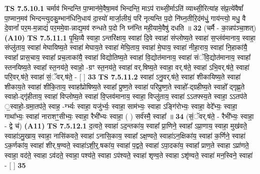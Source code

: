 \documentclass[17pt]{extarticle}
\begin{document}
                                        \textbf{ TS 7.5.10.1} \newline
                  चर्माव॑ भिन्दन्ति पा॒प्मान॑मे॒वैषा॒मव॑ भिन्दन्ति॒ माऽप॑ राथ्सी॒र्माऽति॑ व्याथ्सी॒रित्या॑ह संप्र॒त्ये॑वैषां᳚ पा॒प्मान॒मव॑ भिन्दन्त्युदकु॒म्भान॑धिनि॒धाय॑ दा॒स्यो॑ मार्जा॒लीयं॒ परि॑ नृत्यन्ति प॒दो नि॑घ्न॒तीरि॒दंम॑धुं॒ गाय॑न्त्यो॒ मधु॒ वै दे॒वानां᳚ पर॒म-म॒न्नाद्यं॑ पर॒ममे॒वा-न्नाद्य॒मव॑ रुन्धते प॒दो नि घ्न॑न्ति मही॒यामे॒वैषु॑ दधति ॥ \textbf{  32} \newline
                  \newline
                      (चर्मै - का॒न्नप॑ञ्चा॒शत्)  \textbf{(A10)} \newline \newline
                                        \textbf{ TS 7.5.11.1} \newline
                  पृ॒थि॒व्यै स्वाहा॒ ऽन्तरि॑क्षाय॒ स्वाहा॑ दि॒वे स्वाहा॑ संप्लोष्य॒ते स्वाहा॑ स॒प्लंव॑मानाय॒ स्वाहा॒ संप्लु॑ताय॒ स्वाहा॑ मेघायिष्य॒ते स्वाहा॑ मेघाय॒ते स्वाहा॑ मेघि॒ताय॒ स्वाहा॑ मे॒घाय॒ स्वाहा॑ नीहा॒राय॒ स्वाहा॑ नि॒हाका॑यै॒ स्वाहा᳚ प्रास॒चाय॒ स्वाहा᳚ प्रच॒लाका॑यै॒ स्वाहा॑ विद्योतिष्य॒ते स्वाहा॑ वि॒द्योत॑मानाय॒ स्वाहा॑ संॅवि॒द्योत॑मानाय॒ स्वाहा᳚ स्तनयिष्य॒ते स्वाहा᳚ स्त॒नय॑ते॒ स्वाहो॒ -ग्रꣳ स्त॒नय॑ते॒ स्वाहा॑ वर्.षिष्य॒ते स्वाहा॒ वर्.ष॑ते॒ स्वाहा॑ ऽभि॒वर्.ष॑ते॒ स्वाहा॑ परि॒वर्.ष॑ते॒ स्वाहा॑ सं॒ॅवर्.ष॑ते॒ - [  ] \textbf{  33} \newline
                  \newline
                                \textbf{ TS 7.5.11.2} \newline
                  स्वाहा॑ ऽनु॒वर्.ष॑ते॒ स्वाहा॑ शीकायिष्य॒ते स्वाहा॑ शीकाय॒ते स्वाहा॑ शीकि॒ताय॒ स्वाहा᳚प्रोषिष्य॒ते स्वाहा᳚ प्रुष्ण॒ते स्वाहा॑ परिप्रुष्ण॒ते स्वाहो᳚-द्ग्रहीष्य॒ते स्वाहो᳚ द्गृह्ण॒ते स्वाहो-द्गृ॑हीताय॒ स्वाहा॑ विप्लोष्य॒ते स्वाहा॑ वि॒प्लव॑मानाय॒ स्वाहा॒ विप्लु॑ताय॒ स्वाहा॑ ऽऽतफ्स्य॒ते स्वाहा॒ ऽऽतप॑ते ॒स्वाहो॒-ग्रमा॒तप॑ते॒ स्वाह॒ -र्ग्भ्यः स्वाहा॒ यजु॑र्भ्यः॒ स्वाहा॒ साम॑भ्यः॒ स्वाहा ऽङ्गि॑रोभ्यः॒ स्वाहा॒ वेदे᳚भ्यः॒ स्वाहा॒ गाथा᳚भ्यः॒ स्वाहा॑ नाराशꣳ॒॒सीभ्यः॒ स्वाहा॒ रैभी᳚भ्यः स्वाहा॒ ( ) सर्व॑स्मै॒ स्वाहा᳚ ॥ \textbf{  34} \newline
                  \newline
                      (सं॒ॅवर्.ष॑ते॒ - रैभी᳚भ्यः॒ स्वाहा॒ - द्वे च॑)  \textbf{(A11)} \newline \newline
                                        \textbf{ TS 7.5.12.1} \newline
                  द॒त्वते॒ स्वाहा॑ ऽद॒न्तका॑य॒ स्वाहा᳚ प्रा॒णिने॒ स्वाहा᳚ ऽप्रा॒णाय॒ स्वाहा॒ मुख॑वते॒ स्वाहा॑ऽमु॒खाय॒ स्वाहा॒ नासि॑कवते॒ स्वाहा॑ ऽनासि॒काय॒ स्वाहा᳚ ऽक्ष॒ण्वते॒ स्वाहा॑ऽन॒क्षिका॑य॒ स्वाहा॑ क॒र्णिने॒ स्वाहा॑ ऽक॒र्णका॑य॒ स्वाहा॑ शीर्.ष॒ण्वते॒ स्वाहा॑ऽशी॒र्॒.षका॑य॒ स्वाहा॑ प॒द्वते॒ स्वाहा॑ ऽपा॒दका॑य॒ स्वाहा᳚ प्राण॒ते स्वाहा ऽप्रा॑णते॒ स्वाहा॒ वद॑ते॒ स्वाहा ऽव॑दते॒ स्वाहा॒ पश्य॑ते॒ स्वाहा ऽप॑श्यते॒ स्वाहा॑ शृण्व॒ते स्वाहा ऽशृ॑ण्वते॒ स्वाहा॑ मन॒स्विने॒ स्वाहा॑ - [  ] \textbf{  35} \newline
\end{document}

